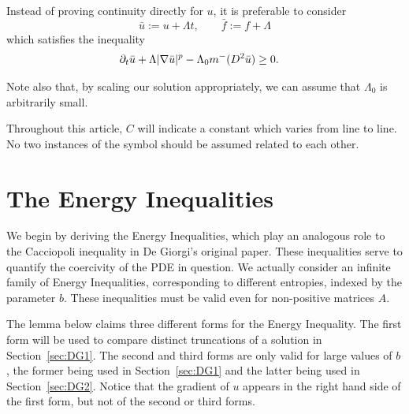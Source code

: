 Instead of proving continuity directly for $u$, it is preferable to consider
\[ \bar{u} := u + \Lambda t, \qquad \bar{f} := f + \Lambda\]
which satisfies the inequality
\begin{align}
\partial_t \bar{u} + \Lambda |\nabla \bar{u}|^p - \Lambda_0 m^-(D^2\bar{u}) &\geq 0. \label{eq:mainPDEvisc}
\end{align}

Note also that, by scaling our solution appropriately, we can assume that $\Lambda_0$ is arbitrarily small.  

Throughout this article, $C$ will indicate a constant which varies from line to line.  No two instances of the symbol should be assumed related to each other.  



\section{The Energy Inequalities} \label{sec:energy}


\newcommand{\upl}{u_*}

We begin by deriving the Energy Inequalities, which play an analogous role to the Cacciopoli inequality in De Giorgi's original paper.  These inequalities serve to quantify the coercivity of the PDE in question.  We actually consider an infinite family of Energy Inequalities, corresponding to different entropies, indexed by the parameter $b$.  These inequalities must be valid even for non-positive matrices $A$.  

The lemma below claims three different forms for the Energy Inequality.  The first form will be used to compare distinct truncations of a solution in Section~\ref{sec:DG1}.  The second and third forms are only valid for large values of $b$, the former being used in Section~\ref{sec:DG1} and the latter being used in Section~\ref{sec:DG2}.  Notice that the gradient of $u$ appears in the right hand side of the first form, but not of the second or third forms.  

